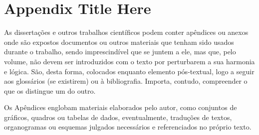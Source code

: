 
\chapter{Appendix Title Here} %

\label{AppendixA} %

As dissertações e outros trabalhos científicos podem conter apêndices ou anexos onde são expostos documentos ou outros materiais que tenham sido usados durante o trabalho, sendo imprescindível que se juntem a ele, mas que, pelo volume, não devem ser introduzidos com o texto por perturbarem a sua harmonia e lógica. São, desta forma, colocados enquanto elemento pós-textual, logo a seguir aos glossários (se existirem) ou à bibliografia. Importa, contudo, compreender o que os distingue um do outro.

Os Apêndices englobam materiais elaborados pelo autor, como conjuntos de gráficos, quadros ou tabelas de dados, eventualmente, traduções de textos, organogramas ou esquemas julgados necessários e referenciados no próprio texto.